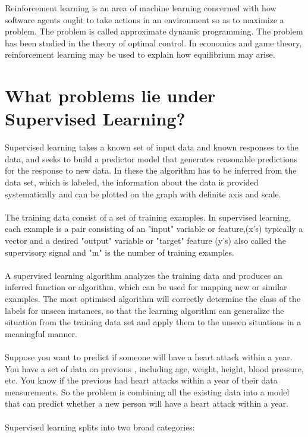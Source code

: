 \documentclass[a4paper, 12pt]{article}
\begin{document}
Reinforcement learning is an area of machine learning  concerned with how software agents ought to take actions in an environment so as to maximize a problem. The problem is called approximate dynamic programming. The problem has been studied in the theory of optimal control. In economics and game theory, reinforcement learning may be used to explain how equilibrium may arise.

\section{What problems lie under Supervised Learning?}

Supervised learning takes a known set of input data and known responses to the data, and seeks to build a predictor model that generates reasonable predictions for the response to new data. In these the algorithm has to be inferred from the data set, which is labeled, the information about the data is provided systematically and can be plotted on the graph with definite axis and scale.\\\\The training data consist of a set of training examples. In supervised learning, each example is a pair consisting of an "input" variable or feature,(x's) typically a vector and a desired "output" variable or "target" feature (y's) also called the supervisory signal and "m" is the number of training examples.\\\\A supervised learning algorithm analyzes the training data and produces an inferred function or algorithm, which can be used for mapping new or similar examples. The most optimised algorithm will correctly determine the class of the labels for unseen instances, so that the learning algorithm can generalize the situation from the training data set and apply them to the unseen situations in a meaningful manner. \\\\Suppose you want to predict if someone will have a heart attack within a year. You have a set of data on previous , including age, weight, height, blood pressure, etc. You know if the previous had heart attacks within a year of their data measurements. So the problem is combining all the existing data into a model that can predict whether a new person will have a heart attack within a year. \\\\Supervised learning splits into two broad categories:
\end{document}
